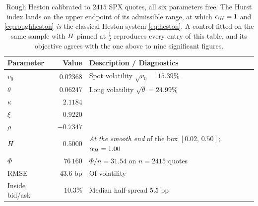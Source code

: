 \begin{table}[H]
\centering
\small
\begin{tabularx}{\textwidth}{lrX}
\toprule
Parameter & Value & Description / Diagnostics \\
\midrule
$v_{0}$        & $0.02368$ & Spot volatility $\sqrt{v_{0}} = 15.39\%$ \\
$\theta$       & $0.06247$ & Long volatility $\sqrt{\theta} = 24.99\%$ \\
$\kappa$       & $2.1184$  & \\
$\xi$          & $0.9220$  & \\
$\rho$         & $-0.7347$ & \\
$H$       & $0.5000$  & \emph{At the smooth end} of the box $[0.02,\,0.50]$; $\alpha_{H}=1.00$ \\
\midrule
$\Phi$         & $76\,160$ & $\Phi/n = 31.54$ on $n = 2415$ quotes \\
RMSE           & $43.6\text{ bp}$ & Of volatility \\
Inside bid/ask & $10.3\%$  & Median half-spread $5.5\text{ bp}$ \\
\bottomrule
\end{tabularx}
\caption[Rough Heston calibrated to the SPX book]{Rough Heston calibrated to $2415$ SPX quotes, all six
parameters free. The Hurst index lands on the upper endpoint of its admissible range,
at which $\alpha_{H}=1$ and \eqref{eq:roughheston} \emph{is} the classical Heston system
\eqref{eq:heston}. A control fitted on the same sample with $H$ pinned at $\tfrac12$
reproduces every entry of this table, and its objective agrees with the one above to nine
significant figures.}
\label{tab:rhfit}
\end{table}



